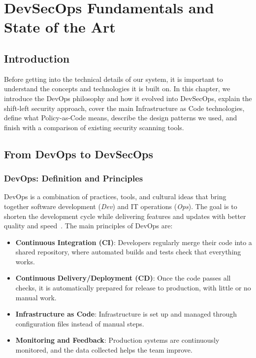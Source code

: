 
\chapter{DevSecOps Fundamentals and State of the Art}
\label{chap:fundamentals}

\section{Introduction}

Before getting into the technical details of our system, it is important to understand the concepts and technologies it is built on. In this chapter, we introduce the DevOps philosophy and how it evolved into DevSecOps, explain the shift-left security approach, cover the main Infrastructure as Code technologies, define what Policy-as-Code means, describe the design patterns we used, and finish with a comparison of existing security scanning tools.


\section{From DevOps to DevSecOps}
\label{sec:devops-devsecops}

\subsection{DevOps: Definition and Principles}

DevOps is a combination of practices, tools, and cultural ideas that bring together software development (\emph{Dev}) and IT operations (\emph{Ops}). The goal is to shorten the development cycle while delivering features and updates with better quality and speed~\cite{bass2015devops}. The main principles of DevOps are:

\begin{itemize}[leftmargin=1.5cm]
  \item \textbf{Continuous Integration (CI)}: Developers regularly merge their code into a shared repository, where automated builds and tests check that everything works.
  \item \textbf{Continuous Delivery/Deployment (CD)}: Once the code passes all checks, it is automatically prepared for release to production, with little or no manual work.
  \item \textbf{Infrastructure as Code}: Infrastructure is set up and managed through configuration files instead of manual steps.
  \item \textbf{Monitoring and Feedback}: Production systems are continuously monitored, and the data collected helps the team improve.
\end{itemize}

